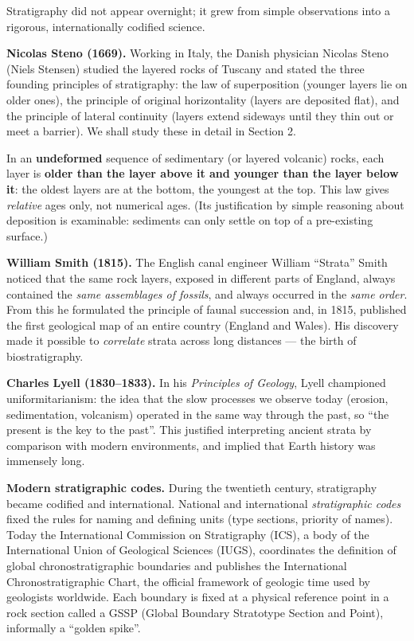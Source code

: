 \documentclass[11pt]{article}
\newcommand{\cle}[1]{{\popxbold\color{popdark}#1}}
\newcounter{popsec}
\newcounter{popsub}
\newcommand{\courssub}[1]{%
  \stepcounter{popsub}%
  \par\vspace{9pt}\noindent{\popxbold\fontsize{11.5}{13}\selectfont\color{popink}{\color{poporange}\thepopsec.\thepopsub}\hspace{6pt}#1}\par\nopagebreak\vspace{4pt}
}
\begin{document}
\courssub{Historical Development of Stratigraphy}

Stratigraphy did not appear overnight; it grew from simple observations into a rigorous, internationally codified science.

\textbf{Nicolas Steno (1669).} Working in Italy, the Danish physician Nicolas Steno (Niels Stensen) studied the layered rocks of Tuscany and stated the three founding principles of stratigraphy: the \cle{law of superposition} (younger layers lie on older ones), the \cle{principle of original horizontality} (layers are deposited flat), and the \cle{principle of lateral continuity} (layers extend sideways until they thin out or meet a barrier). We shall study these in detail in Section 2.

\begin{propriete}
In an \textbf{undeformed} sequence of sedimentary (or layered volcanic) rocks, each layer is \textbf{older than the layer above it and younger than the layer below it}: the oldest layers are at the bottom, the youngest at the top. This law gives \emph{relative} ages only, not numerical ages. (Its justification by simple reasoning about deposition is examinable: sediments can only settle on top of a pre-existing surface.)
\end{propriete}

\textbf{William Smith (1815).} The English canal engineer William ``Strata'' Smith noticed that the same rock layers, exposed in different parts of England, always contained the \emph{same assemblages of fossils}, and always occurred in the \emph{same order}. From this he formulated the \cle{principle of faunal succession} and, in 1815, published the first geological map of an entire country (England and Wales). His discovery made it possible to \emph{correlate} strata across long distances --- the birth of biostratigraphy.

\textbf{Charles Lyell (1830--1833).} In his \emph{Principles of Geology}, Lyell championed \cle{uniformitarianism}: the idea that the slow processes we observe today (erosion, sedimentation, volcanism) operated in the same way through the past, so ``the present is the key to the past''. This justified interpreting ancient strata by comparison with modern environments, and implied that Earth history was immensely long.

\textbf{Modern stratigraphic codes.} During the twentieth century, stratigraphy became codified and international. National and international \emph{stratigraphic codes} fixed the rules for naming and defining units (type sections, priority of names). Today the \cle{International Commission on Stratigraphy} (ICS), a body of the International Union of Geological Sciences (IUGS), coordinates the definition of global chronostratigraphic boundaries and publishes the \cle{International Chronostratigraphic Chart}, the official framework of geologic time used by geologists worldwide. Each boundary is fixed at a physical reference point in a rock section called a \cle{GSSP} (Global Boundary Stratotype Section and Point), informally a ``golden spike''.
\end{document}
